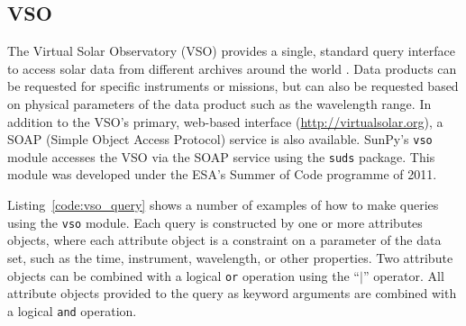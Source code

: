 \subsection{VSO}\label{ssec:vso}

The Virtual Solar Observatory (VSO) provides a single, standard query
interface to access solar data from different archives around the world
 \citep{hill2009}.
Data products can be requested for specific instruments or missions, but
can also be requested based on physical parameters of the data product such
as the wavelength range.
In addition to the VSO's primary, web-based interface
(\url{http://virtualsolar.org}), a SOAP (Simple Object Access Protocol)
service is also available.
SunPy's \texttt{vso} module accesses the VSO via the SOAP service using the
\texttt{suds} package.
This module was developed under the ESA's Summer of Code programme of 2011.

Listing~\ref{code:vso_query} shows a number of examples of how to make queries
using the \texttt{vso} module.
Each query is constructed by one or more attributes objects, where each
attribute object is a constraint on a parameter of the data set, such as the
time, instrument, wavelength, or  other properties.
Two attribute objects can be combined with a logical \texttt{or} operation
using the ``$|$'' operator.
All attribute objects provided to the query as keyword arguments are combined
with a logical \texttt{and} operation.

